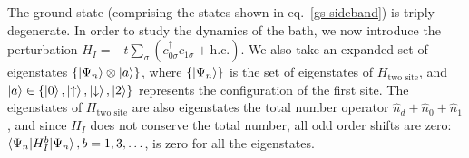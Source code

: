 The ground state (comprising the states shown in eq.~\eqref{gs-sideband}) is triply degenerate. In order to study the dynamics of the bath, we now introduce the perturbation \(H_I = -t\sum_\sigma \left( c^\dagger_{0\sigma}c_{1\sigma} + \text{h.c.}\right) \). We also take an expanded set of eigenstates \(\left\{\ket{\Psi_n}\otimes\ket{a}\right\}\), where \(\left\{\ket{\Psi_n}\right\}\) is the set of eigenstates of \(H_\text{two site}\), and \(\ket{a} \in \left\{ \ket{0}, \ket{\uparrow}, \ket{\downarrow}, \ket{2} \right\} \) represents the configuration of the first site. The eigenstates of \(H_\text{two site}\) are also eigenstates the total number operator \(\hat n_d + \hat n_0 + \hat n_1\), and since \(H_I\) does not conserve the total number, all odd order shifts are zero: \(\braket{\Psi_n | H_I^b | \Psi_n}, b=1,3,\ldots\), is zero for all the eigenstates. 

